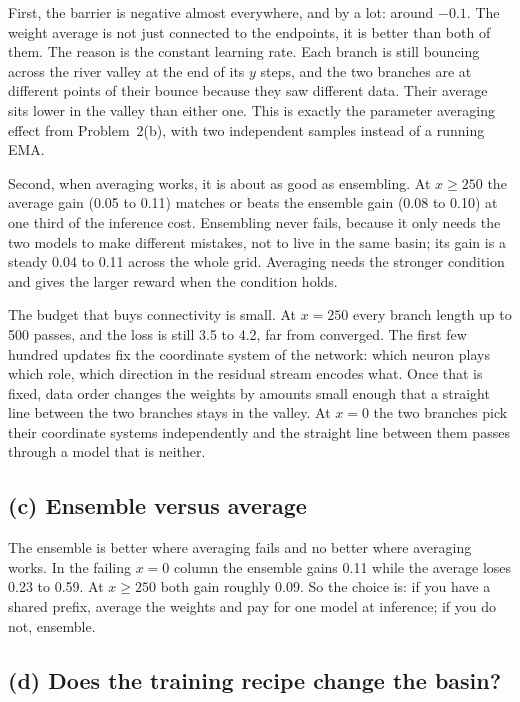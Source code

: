 \documentclass[10pt,letterpaper]{article}
\begin{document}
First, the barrier is negative almost everywhere, and by a lot: around $-0.1$. The weight average is not just connected to the endpoints, it is better than both of them. The reason is the constant learning rate. Each branch is still bouncing across the river valley at the end of its $y$ steps, and the two branches are at different points of their bounce because they saw different data. Their average sits lower in the valley than either one. This is exactly the parameter averaging effect from Problem~2(b), with two independent samples instead of a running EMA.

Second, when averaging works, it is about as good as ensembling. At $x\ge250$ the average gain (0.05 to 0.11) matches or beats the ensemble gain (0.08 to 0.10) at one third of the inference cost. Ensembling never fails, because it only needs the two models to make different mistakes, not to live in the same basin; its gain is a steady 0.04 to 0.11 across the whole grid. Averaging needs the stronger condition and gives the larger reward when the condition holds.

The budget that buys connectivity is small. At $x=250$ every branch length up to 500 passes, and the loss is still 3.5 to 4.2, far from converged. The first few hundred updates fix the coordinate system of the network: which neuron plays which role, which direction in the residual stream encodes what. Once that is fixed, data order changes the weights by amounts small enough that a straight line between the two branches stays in the valley. At $x=0$ the two branches pick their coordinate systems independently and the straight line between them passes through a model that is neither.

\subsection*{(c) Ensemble versus average}

The ensemble is better where averaging fails and no better where averaging works. In the failing $x=0$ column the ensemble gains 0.11 while the average loses 0.23 to 0.59. At $x\ge250$ both gain roughly 0.09. So the choice is: if you have a shared prefix, average the weights and pay for one model at inference; if you do not, ensemble.

\subsection*{(d) Does the training recipe change the basin?}
\end{document}
